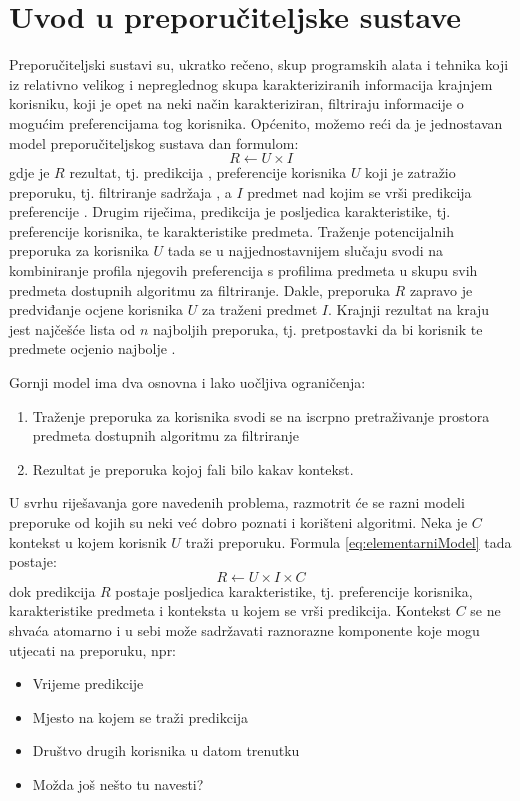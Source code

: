 \documentclass[times, utf8, diplomski, numeric]{fer}
\begin{document}
\section{Uvod u preporučiteljske sustave}
Preporučiteljski sustavi su, ukratko rečeno, skup programskih alata i tehnika
koji iz relativno velikog i nepreglednog skupa karakteriziranih informacija
krajnjem korisniku, koji je opet na neki način karakteriziran, filtriraju
informacije o mogućim preferencijama tog korisnika. Općenito, možemo reći da je
jednostavan model preporučiteljskog sustava dan formulom:
\begin{equation}
\label{eq:elementarniModel}
	R \leftarrow U \times I
\end{equation}
gdje je $R$ rezultat, tj. predikcija ,
preferencije korisnika $U$  koji je zatražio preporuku, tj.
filtriranje sadržaja , a $I$ predmet nad kojim se vrši predikcija preferencije
. Drugim riječima, predikcija je posljedica karakteristike,
tj. preferencije korisnika, te karakteristike predmeta. Traženje potencijalnih
preporuka za korisnika $U$ tada se u najjednostavnijem slučaju svodi na
kombiniranje profila njegovih preferencija s profilima predmeta u skupu svih
predmeta dostupnih algoritmu za filtriranje.
Dakle, preporuka $R$ zapravo je predviđanje ocjene korisnika $U$ za
traženi predmet $I$. Krajnji rezultat na kraju jest najčešće lista od $n$
najboljih preporuka, tj. pretpostavki da bi korisnik te predmete ocjenio
najbolje . 

Gornji model ima dva osnovna i lako uočljiva ograničenja:
\begin{enumerate}
  \item Traženje preporuka za korisnika svodi se na iscrpno pretraživanje
  prostora predmeta dostupnih algoritmu za filtriranje
  \item Rezultat je preporuka kojoj fali bilo kakav kontekst.
\end{enumerate}

U svrhu riješavanja gore navedenih problema, razmotrit će se razni modeli
preporuke od kojih su neki već dobro poznati i korišteni algoritmi. Neka je $C$
kontekst u kojem korisnik $U$ traži preporuku. Formula \ref{eq:elementarniModel}
tada postaje:
\begin{equation}
\label{eq:elementarniModelSKontekstom}
	R \leftarrow U \times I \times C
\end{equation}
dok predikcija $R$ postaje posljedica karakteristike, tj. preferencije
korisnika, karakteristike predmeta i konteksta u kojem se vrši predikcija.
Kontekst $C$ se ne shvaća atomarno i u sebi može sadržavati raznorazne
komponente koje mogu utjecati na preporuku, npr:
\begin{itemize}
  \item Vrijeme predikcije
  \item Mjesto na kojem se traži predikcija
  \item Društvo drugih korisnika u datom trenutku
  \item Možda još nešto tu navesti?
\end{itemize}
\end{document}
